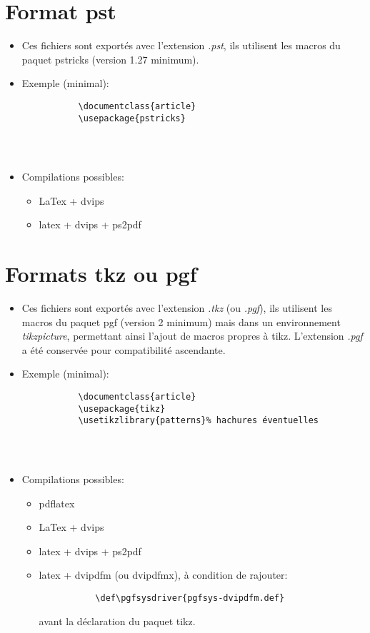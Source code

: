 \section{Format pst}

\begin{itemize}

\item Ces fichiers sont exportés avec l'extension \textit{.pst}, ils utilisent les macros du paquet pstricks (version 1.27 minimum).

\item Exemple (minimal):

\begin{verbatim}
           \documentclass{article}
           \usepackage{pstricks}
            
             
           
\end{verbatim}
\item Compilations possibles:
\begin{itemize}
\item LaTex + dvips
\item latex + dvips + ps2pdf
\end{itemize}
\end{itemize}


\section{Formats tkz ou pgf}

\begin{itemize}

\item Ces fichiers sont exportés avec l'extension \textit{.tkz} (ou \textit{.pgf}), ils utilisent les macros du paquet pgf (version 2 minimum) mais dans un environnement \textsl{tikzpicture}, permettant ainsi l'ajout de macros propres à tikz. L'extension \textit{.pgf} a été conservée pour compatibilité ascendante. 
\item Exemple (minimal):

\begin{verbatim}
           \documentclass{article}
           \usepackage{tikz}
           \usetikzlibrary{patterns}% hachures éventuelles
            
             
           
\end{verbatim}
\item Compilations possibles:
\begin{itemize}
\item pdflatex
\item LaTex + dvips
\item latex + dvips + ps2pdf
\item latex + dvipdfm (ou dvipdfmx), à condition de rajouter: 

\begin{verbatim}
           \def\pgfsysdriver{pgfsys-dvipdfm.def}
\end{verbatim}

avant la déclaration du paquet tikz.
\end{itemize}
\end{itemize}

